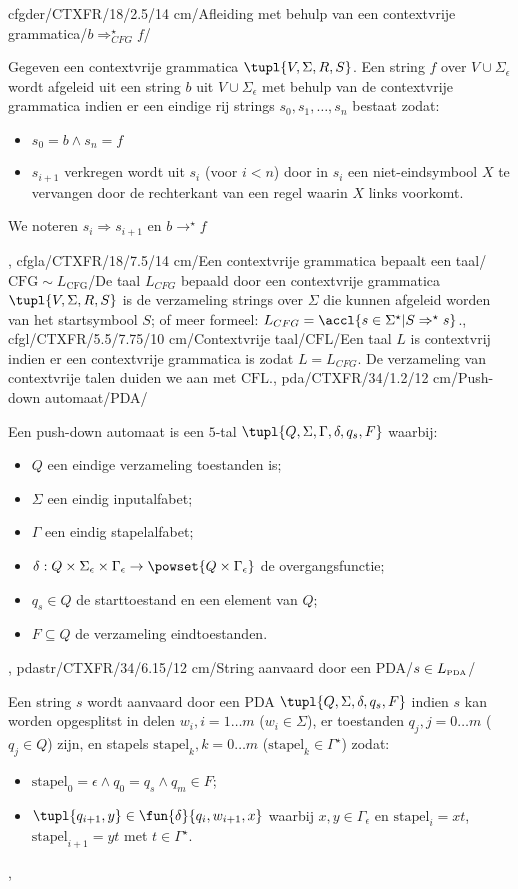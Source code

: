 cfgder/CTXFR/18/2.5/14 cm/Afleiding met behulp van een contextvrije grammatica/$b\Rightarrow_{CFG}^{\star}f$/{Gegeven een contextvrije grammatica $\tupl{V,\Sigma,R,S}$. Een string $f$ over $V\cup\Sigma_{\epsilon}$ wordt afgeleid uit een string $b$ uit $V\cup\Sigma_{\epsilon}$ met behulp van de contextvrije grammatica indien er een eindige rij strings $s_0,s_1,\ldots,s_n$ bestaat zodat:\begin{itemize}
 \item $s_0=b\wedge s_n=f$
 \item $s_{i+1}$ verkregen wordt uit $s_i$ (voor $i<n$) door in $s_i$ een niet-eindsymbool $X$ te vervangen door de rechterkant van een regel waarin $X$ links voorkomt.
\end{itemize}
We noteren $s_i\Rightarrow s_{i+1}$ en $b\rightarrow^{\star}f$},
cfgla/CTXFR/18/7.5/14 cm/Een contextvrije grammatica bepaalt een taal/$\mbox{CFG}\sim L_{\mbox{CFG}}$/{De taal $L_{CFG}$ bepaald door een contextvrije grammatica $\tupl{V,\Sigma,R,S}$ is de verzameling strings over $\Sigma$ die kunnen afgeleid worden van het startsymbool $S$; of meer formeel: $L_{CFG}=\accl{s\in\Sigma^{\star}|S\Rightarrow^{\star}s}$.},
cfgl/CTXFR/5.5/7.75/10 cm/Contextvrije taal/$\mbox{CFL}$/{Een taal $L$ is contextvrij indien er een contextvrije grammatica is zodat $L=L_{CFG}$. De verzameling van contextvrije talen duiden we aan met $\mbox{CFL}$.},
pda/CTXFR/34/1.2/12 cm/Push-down automaat/PDA/{Een push-down automaat is een $5$-tal $\tupl{Q,\Sigma,\Gamma,\delta,q_s,F}$ waarbij:\begin{itemize}
 \item $Q$ een eindige verzameling toestanden is;
 \item $\Sigma$ een eindig inputalfabet;
 \item $\Gamma$ een eindig stapelalfabet;
 \item $\delta:Q\times\Sigma_{\epsilon}\times\Gamma_{\epsilon}\rightarrow\powset{Q\times\Gamma_{\epsilon}}$ de overgangsfunctie;
 \item $q_s\in Q$ de starttoestand en een element van $Q$;
 \item $F\subseteq Q$ de verzameling eindtoestanden.
\end{itemize}},
pdastr/CTXFR/34/6.15/12 cm/String aanvaard door een PDA/$s\in L_{\mbox{\tiny PDA}}$/{Een string $s$ wordt aanvaard door een PDA $\tupl{Q,\Sigma,\delta,q_s,F}$ indien $s$ kan worden opgesplitst in
delen $w_i,i=1\ldots m$ ($w_i\in\Sigma$), er toestanden $q_j,j=0\ldots m$ ($q_j\in Q$) zijn, en stapels $\mbox{stapel}_k,k=0\ldots m$ ($\mbox{stapel}_k\in\Gamma^{\star}$) zodat:\begin{itemize}
 \item $\mbox{stapel}_0=\epsilon\wedge q_0=q_s\wedge q_m\in F$;
 \item $\tupl{q_{i+1},y}\in\fun{\delta}{q_i,w_{i+1},x}$ waarbij $x,y\in\Gamma_{\epsilon}$ en $\mbox{stapel}_i=xt$, $\mbox{stapel}_{i+1}=yt$ met $t\in\Gamma^{\star}$.
\end{itemize}},
